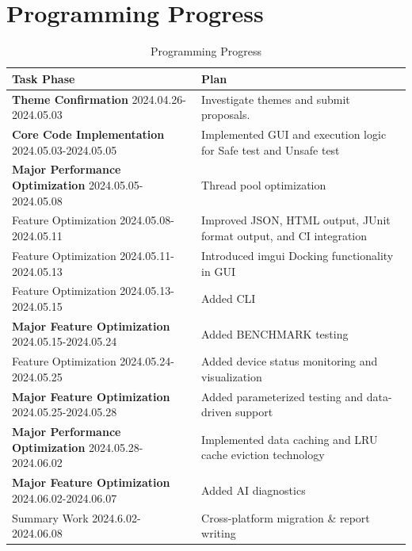 \documentclass{article}
\begin{document}
\section{Programming Progress}
\begin{table}[H]
    \centering
    \begin{tabular}{|l|l|}
        \toprule
        \textbf{Task Phase}                                           & \textbf{Plan}                                                       \\ \midrule
        \textbf{Theme Confirmation} 2024.04.26-2024.05.03             & Investigate themes and submit proposals.                            \\ \midrule
        \textbf{Core Code Implementation} 2024.05.03-2024.05.05       & Implemented GUI and execution logic for Safe test and Unsafe test   \\ \midrule
        \textbf{Major Performance Optimization} 2024.05.05-2024.05.08 & Thread pool optimization                                            \\ \midrule
        Feature Optimization 2024.05.08-2024.05.11                    & Improved JSON, HTML output, JUnit format output, and CI integration \\ \midrule
        Feature Optimization 2024.05.11-2024.05.13                    & Introduced imgui Docking functionality in GUI                       \\ \midrule
        Feature Optimization 2024.05.13-2024.05.15                    & Added CLI                                                           \\ \midrule
        \textbf{Major Feature Optimization} 2024.05.15-2024.05.24     & Added BENCHMARK testing                                             \\ \midrule
        Feature Optimization 2024.05.24-2024.05.25                    & Added device status monitoring and visualization                    \\ \midrule
        \textbf{Major Feature Optimization} 2024.05.25-2024.05.28     & Added parameterized testing and data-driven support                 \\ \midrule
        \textbf{Major Performance Optimization} 2024.05.28-2024.06.02 & Implemented data caching and LRU cache eviction technology          \\ \midrule
        \textbf{Major Feature Optimization}  2024.06.02-2024.06.07    & Added AI diagnostics                                                \\ \midrule
        Summary Work 2024.6.02-2024.06.08                             & Cross-platform migration \& report writing                          \\
        \bottomrule
    \end{tabular}
    \caption{Programming Progress}
\end{table}
\end{document}
